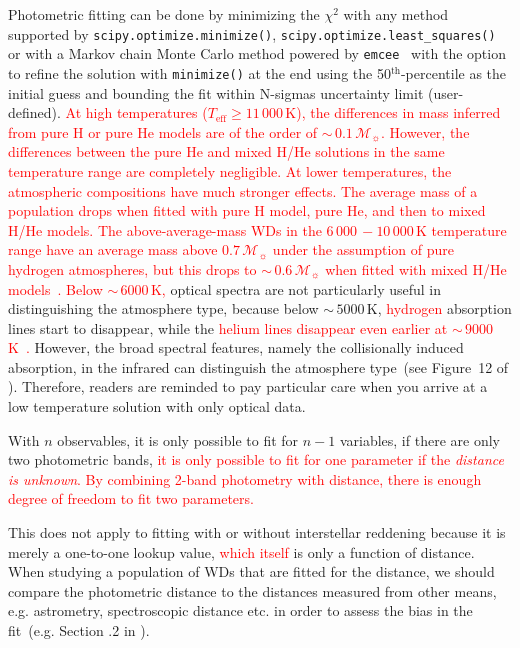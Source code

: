 \documentclass[fleqn,usenatbib]{rasti}
\newcommand{\msun}{\mathcal{M}_{\sun}}
\begin{document}
Photometric fitting can be done by minimizing the $\chi^2$ with any method
supported by \verb+scipy.optimize.minimize()+,
\verb+scipy.optimize.least_squares()+ or with a Markov chain Monte
Carlo method powered by \texttt{emcee}~\citep{2013PASP..125..306F} with the
option to refine the solution with \verb+minimize()+ at the end using the
50$^{\mathrm{th}}$-percentile as the initial guess and bounding the fit
within N-sigmas uncertainty limit (user-defined). \textcolor{red}{At high
temperatures ($T_{\mathrm{eff}} \geq 11\,000$\,K), the differences in mass
inferred from pure H or pure He models are of the order of
$\sim$\,$0.1\,\msun$. However, the differences between the pure He and mixed
H/He solutions in the same temperature range are completely negligible. At
lower temperatures, the atmospheric \textcolor{red}{compositions} have much
stronger effects. The average mass of a population drops when fitted with
pure H model, pure He, and then to mixed H/He models. The
\textcolor{red}{above-average-mass} WDs in the $6\,000\,-10\,000$\,K
temperature range \textcolor{red}{have} an average mass above $0.7\,\msun$
under the assumption of pure hydrogen atmospheres, but this drops to
$\sim$\,$0.6\,\msun$ when fitted with mixed
H/He models~\citep{2019ApJ...876...67B}. Below $\sim$\,$6000$\,K,} optical
spectra are not particularly useful in distinguishing the atmosphere
type, because below $\sim$\,$5000$\,K, \textcolor{red}{hydrogen} absorption
lines start to disappear, while the \textcolor{red}{helium lines disappear
even earlier at $\sim$\,$9000$\,K~\citep{2018ApJ...857...56R}.} However, the
broad spectral features, namely the collisionally induced absorption, in the
infrared can distinguish the atmosphere type~(see Figure~12 of
\citealt{2017ApJ...848...36B}). Therefore, readers are reminded to pay
particular care when you arrive at a low temperature solution with only
optical data.

With $n$ observables, it is only possible to fit for $n-1$ variables, if there
are only two photometric bands, \textcolor{red}{it is only possible to fit
for one parameter if the \textit{distance is unknown}. By combining 2-band
photometry with distance, there is enough degree of freedom to fit two
parameters.}

This does not apply to fitting with or without interstellar reddening because
it is merely a one-to-one lookup value, \textcolor{red}{which itself} is
only a function of distance. When studying a population of WDs that are fitted
for the distance, we should compare the photometric distance to the distances
measured from other means, e.g. astrometry, spectroscopic distance etc. in order
to assess the bias in the fit~(e.g. Section .2
in \citealt{2011MNRAS.417...93R}).
\end{document}
